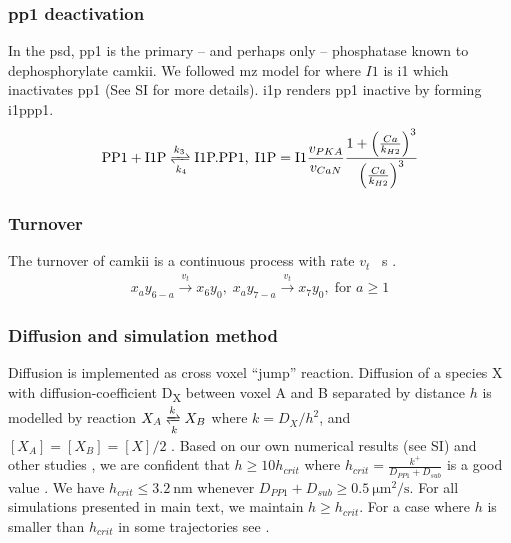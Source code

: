 \documentclass[9pt,lineno,doublespacing]{elife}
\newcommand\SUB[2]{#1\textsubscript{#2}}
\begin{document}
{\subsubsection{\gls{pp1} deactivation}\label{subsubsec:pp1_deactivation} In the
\gls{psd}, \gls{pp1} is the primary -- and perhaps only -- phosphatase known to
dephosphorylate \gls{camkii}\citep{strack_translocation_1997}.  We followed
\gls{mz} model for  where $I1$ is \gls{i1} which inactivates
\gls{pp1} (See SI for more details). \Gls{i1p} renders \gls{pp1} inactive by
forming \gls{i1ppp1}. 
\begin{equation}\label{eq:i1pandpp1}
    \begin{gathered}
        \text{PP1} + \text{I1P} \xrightleftharpoons[k_4]{k_3} \text{I1P.PP1},\;
        \text{I1P} = \text{I1} \frac{v_{PKA}}{v_{CaN}} 
            \frac{1+\left(\frac{Ca}{k_{H2}}\right)^3}{\left(\frac{Ca}{k_{H2}}\right)^3}
    \end{gathered}
\end{equation}

\subsubsection{Turnover}\label{turnover}
The turnover of \gls{camkii} is a continuous process with rate
$v_{t}$ \si{\per\second} .
\begin{equation} \label{eq:turnover}
    \begin{gathered}
        x_ay_{6-a} \xrightarrow{v_t} x_6y_0,\;
        x_ay_{7-a} \xrightarrow{v_t} x_7y_0,\; \text{for } a \ge 1
    \end{gathered}
\end{equation}

\subsubsection{Diffusion and simulation method}\label{subsec:simulator}
Diffusion is implemented as cross voxel ``jump'' reaction. Diffusion of a
species X with diffusion-coefficient \SUB{D}{X} between voxel A and B separated
by distance $h$ is modelled by reaction $X_A \xrightleftharpoons[k]{k} X_B$
where \( k={D_X}/{h^2}\), and \([X_A]=[X_B]=[X]/2 \)
\citep{erban_practical_2007}.  Based on our own numerical results (see SI) and
other studies \citep{isaacson_reaction-diffusion_2009,erban_stochastic_2009}, we
are confident that \( h \ge 10h_{crit}\) where
\(h_{crit}=\frac{k^+}{D_{PP1}+D_{sub}}\) is a good value
\citep{erban_stochastic_2009}.  We have \( h_{crit} \le \SI{3.2}{\nano\meter} \)
whenever $D_{PP1}+D_{sub}\ge\SI{0.5}{\micro\meter\squared\per\second}$. For all
simulations presented in main text, we maintain $h\ge h_{crit}$.  For a case
where $h$ is smaller than $h_{crit}$ in some trajectories see
. 

}
\end{document}
